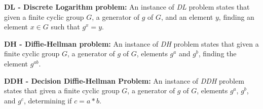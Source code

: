      
      \textbf{DL - Discrete Logarithm problem:} 
      An instance of \textit{DL} problem states that given a finite cyclic group $G$, a generator of $g$ of $G$, and 
      an element $y$, finding an element $x \in G$ such that $g^{x} = y$.
      
      
      \textbf{DH - Diffie-Hellman problem:}
      An instance of \textit{DH} problem   
      states that given a finite cyclic group $G$, a generator of $g$ of $G$, 
      elements $g^{a}$ and $g^{b}$, finding the element $g^{ab}$.
      
      
      \textbf{DDH - Decision Diffie-Hellman Problem:}
      An instance of \textit{DDH} problem states that given a finite cyclic group $G$, a generator of $g$ of $G$,
      elements $g^{a}$, $g^{b}$, and $g^{c}$, determining if $c = a * b$.
      
           	 
     
